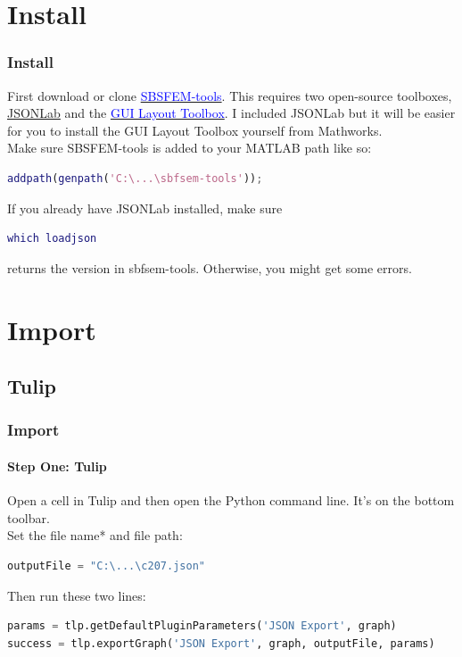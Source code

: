 \documentclass[11pt]{beamer}
\begin{document}
\section{Install}
\begin{frame}[fragile]
	\frametitle{Install}
	First download or clone \href{www.github.com/sarastokes/sbfsem-tools}{\textcolor{blue}{SBSFEM-tools}}.
	This requires two open-source toolboxes, \href{https://www.mathworks.com/matlabcentral/fileexchange/33381-jsonlab--a-toolbox-to-encode-decode-json-files}{JSONLab} and the \href{https://www.mathworks.com/matlabcentral/fileexchange/47982-gui-layout-toolbox}{\textcolor{blue}{GUI Layout Toolbox}}. I included JSONLab but it will be easier for you to install the GUI Layout Toolbox yourself from Mathworks.\\
	Make sure SBSFEM-tools is added to your MATLAB path like so:
	\begin{lstlisting}[language=matlab]	
	addpath(genpath('C:\...\sbfsem-tools'));\end{lstlisting}
	If you already have JSONLab installed, make sure 
	\begin{lstlisting}[language=matlab] 
	which loadjson\end{lstlisting} 
	returns the version in sbfsem-tools. Otherwise, you might get some errors.
\end{frame}
\section{Import}
\subsection{Tulip}
\begin{frame}[fragile]
	\frametitle{Import}
	\framesubtitle{Step One: Tulip}
	\begin{block}{}
		Open a cell in Tulip and then open the Python command line. It's on the bottom toolbar.\\
		Set the file name* and file path:
		\begin{lstlisting}[language=python]
outputFile = "C:\...\c207.json"\end{lstlisting}
		Then run these two lines:
		\begin{lstlisting}[language=python]
params = tlp.getDefaultPluginParameters('JSON Export', graph)
success = tlp.exportGraph('JSON Export', graph, outputFile, params)\end{lstlisting}
	\end{block}
\end{frame}
\end{document}
